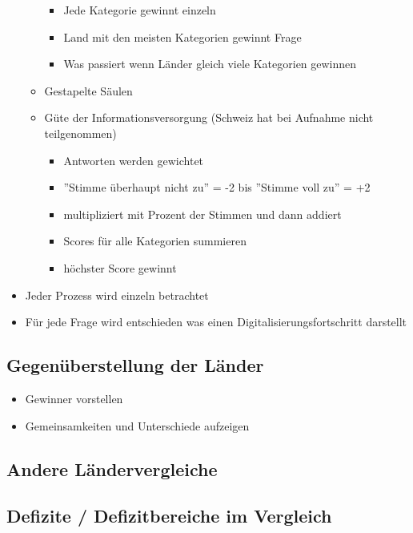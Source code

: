 \begin{itemize}
\begin{itemize}
		\begin{itemize}
			\item Jede Kategorie gewinnt einzeln
			\item Land mit den meisten Kategorien gewinnt Frage
			\item Was passiert wenn Länder gleich viele Kategorien gewinnen
		\end{itemize}
		\item Gestapelte Säulen
		\item Güte der Informationsversorgung (Schweiz hat bei Aufnahme nicht teilgenommen)
		\begin{itemize}
			\item Antworten werden gewichtet
			\item ''Stimme überhaupt nicht zu'' = -2 bis ''Stimme voll zu'' = +2
			\item multipliziert mit Prozent der Stimmen und dann addiert
			\item Scores für alle Kategorien summieren
			\item höchster Score gewinnt
		\end{itemize}
	\end{itemize}
	\item Jeder Prozess wird einzeln betrachtet
	\item Für jede Frage wird entschieden was einen Digitalisierungsfortschritt darstellt
\end{itemize}

\subsection{Gegenüberstellung der Länder}
\begin{itemize}
	\item Gewinner vorstellen
	\item Gemeinsamkeiten und Unterschiede aufzeigen
\end{itemize}
\subsection{Andere Ländervergleiche}
\subsection{Defizite / Defizitbereiche im Vergleich}